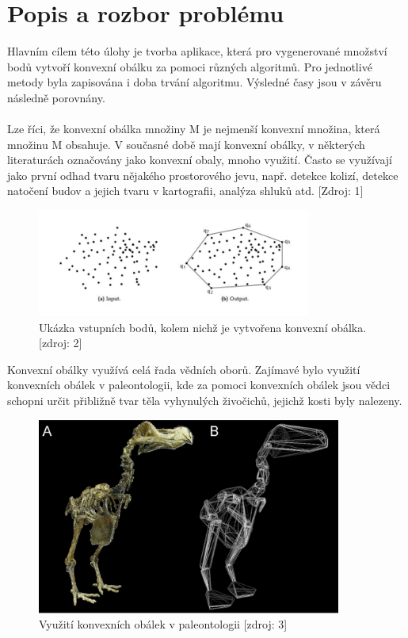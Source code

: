 \documentclass[a4paper, 12pt]{article}
\begin{document}
\section{Popis a rozbor problému}
Hlavním cílem této úlohy je tvorba aplikace, která pro vygenerované množství bodů vytvoří konvexní obálku za pomoci různých algoritmů. Pro jednotlivé metody byla zapisována i doba trvání algoritmu. Výsledné časy jsou v závěru následně porovnány.\\
\\
Lze říci, že konvexní obálka množiny M je nejmenší konvexní množina, která množinu M obsahuje. V současné době mají konvexní obálky, v některých literaturách označovány jako konvexní obaly, mnoho využití. Často se využívají jako první odhad tvaru nějakého prostorového jevu, např. detekce kolizí, detekce natočení budov a jejich tvaru v kartografii, analýza shluků atd. [Zdroj: 1]
\\

\begin{figure}[h!]
	\centering
	\includegraphics[width=9cm]{convex_hull.jpg}
	\caption{Ukázka vstupních bodů, kolem nichž je vytvořena konvexní obálka. [zdroj: 2]}
\end{figure}

Konvexní obálky využívá celá řada vědních oborů. Zajímavé bylo využití konvexních obálek v paleontologii, kde za pomoci konvexních obálek jsou vědci schopni určit přibližně tvar těla vyhynulých živočichů, jejichž kosti byly nalezeny. \\

\begin{figure}[h!]
	\centering
	\includegraphics[width=10cm]{paleontology.jpg}
	\caption{Využití konvexních obálek v paleontologii [zdroj: 3]}
\end{figure}
\end{document}

